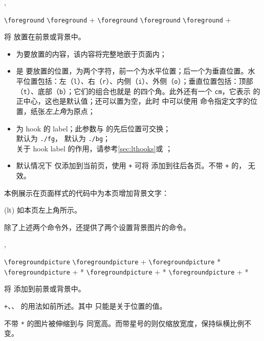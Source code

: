 \documentclass{whudoc}
\begin{document}
\begin{function}{\foreground,\background}
  \begin{syntax}
    \verb|\foreground|   
    \verb|\foreground| + 
    \verb|\foreground|  
    \verb|\foreground|  
    \verb|\foreground| +   
  \end{syntax}
将  放置在前景或背景中。

\begin{itemize}[nosep]
  \item {} 为要放置的内容，该内容将完整地嵌于页面内；
  \item {} 是  要放置的位置，为两个字符，前一个为水平位置；后一个为垂直位置。水平位置包括：左（\texttt{l}）、右（\texttt{r}）、内侧（\texttt{i}）、外侧（\texttt{o}）；垂直位置包括：顶部（\texttt{t}）、底部（\texttt{b}）；它们的组合也就是  的四个角。此外还有一个 \texttt{cm}，它表示  的正中心，这也是默认值；还可以置为空，此时  中可以使用  命令指定文字的位置，纸张\emph{左上角}为原点；
  \item {} 为 hook 的 label；此参数与  的先后位置可交换；\\ 
   默认为 \texttt{./fg}， 默认为 \texttt{./bg}；\\
  关于 hook label 的作用，请参考\cref{sec:lthooks}或 ；
  \item 默认情况下  仅添加到当前页，使用 \texttt{+} 可将  添加到往后各页。不带 \texttt+ 的， 无效。
\end{itemize}
\end{function}

本例展示在页面样式的代码中为本页增加背景文字：
\needspace{3cm}
\begin{xample}
\background(lt){\textcolor{red}{\LARGE\WhuTeX}}
\stopxamplecode
\xampleprint
如本页左上角所示。
\end{xample}

除了上述两个命令外，还提供了两个设置背景图片的命令。

\begin{function}{\foregroundpicture,\backgroundpicture}
  \begin{syntax}
    \verb|\foregroundpicture|     
    \verb|\foregroundpicture| +   
    \verb|\foregroundpicture|   * 
    \verb|\foregroundpicture| + * 
    \verb|\foregroundpicture| + *   
    \verb|\foregroundpicture| + *    
  \end{syntax}
将  添加到前景或背景中。

\texttt{+}、、 的用法如前所述。其中  只能是关于位置的值。

不带 \verb|*| 的图片被伸缩到与  同宽高。而带星号的则仅缩放宽度，保持纵横比例不变。
\end{function}
\end{document}
